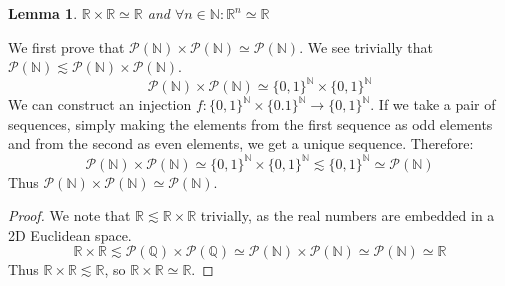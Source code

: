 \documentclass{article}
\newtheorem{lem}{Lemma}[section]
\begin{document}
\medskip
\begin{lem}
$\mathbb{R} \times \mathbb{R} \simeq \mathbb{R}$ and $\forall n \in \mathbb{N}: \mathbb{R}^n \simeq \mathbb{R}$
\end{lem}
We first prove that $\mathcal{P}(\mathbb{N}) \times \mathcal{P}(\mathbb{N}) \simeq \mathcal{P}(\mathbb{N})$. We see trivially that $\mathcal{P}(\mathbb{N}) \lesssim \mathcal{P}(\mathbb{N}) \times \mathcal{P}(\mathbb{N})$.
\begin{equation*}
    \mathcal{P}(\mathbb{N}) \times \mathcal{P}(\mathbb{N}) \simeq \{0, 1\}^\mathbb{N} \times \{0, 1\}^\mathbb{N}
\end{equation*}
We can construct an injection $f: \{0, 1\}^\mathbb{N} \times \{0. 1\}^\mathbb{N} \xrightarrow{} \{0, 1\}^\mathbb{N}$. If we take a pair of sequences, simply making the elements from the first sequence as odd elements and from the second as even elements, we get a unique sequence. Therefore:
\begin{equation*}
    \mathcal{P}(\mathbb{N}) \times \mathcal{P}(\mathbb{N}) \simeq \{0, 1\}^\mathbb{N} \times \{0, 1\}^\mathbb{N} \lesssim \{0, 1\}^\mathbb{N} \simeq \mathcal{P}(\mathbb{N})
\end{equation*}
Thus $\mathcal{P}(\mathbb{N}) \times \mathcal{P}(\mathbb{N}) \simeq \mathcal{P}(\mathbb{N})$.

\vspace{6pt}

\begin{proof}
We note that $\mathbb{R} \lesssim \mathbb{R} \times \mathbb{R}$ trivially, as the real numbers are embedded in a 2D Euclidean space.\\
\begin{equation*}
    \mathbb{R} \times \mathbb{R} \lesssim \mathcal{P}(\mathbb{Q}) \times \mathcal{P}(\mathbb{Q}) \simeq \mathcal{P}(\mathbb{N}) \times \mathcal{P}(\mathbb{N}) \simeq \mathcal{P}(\mathbb{N}) \simeq \mathbb{R}
\end{equation*}
Thus $\mathbb{R} \times \mathbb{R} \lesssim \mathbb{R}$, so $\mathbb{R} \times \mathbb{R} \simeq \mathbb{R}$.
\end{proof}

\vspace{6pt}
\end{document}
